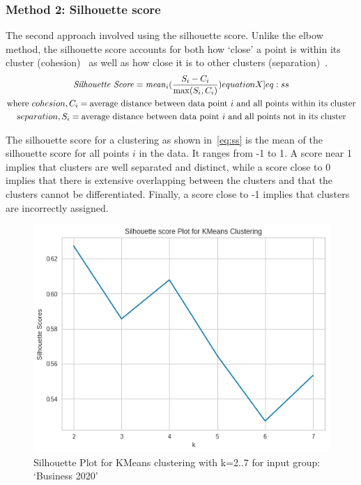 \vspace*{-1ex}
\subsubsection{Method 2: Silhouette score} \label{s:silhouette score}

The second approach involved using the silhouette score. Unlike the elbow method, the silhouette score accounts for both how `close' a point is within its cluster (cohesion)~\cite{elbowvssil} as well as how close it is to other clusters (separation)~\cite{silhouette}.
\begin{gather}
  \mathit{Silhouette \ Score} = \mathit{mean}_i (\frac{S_i - C_i}{\max(S_i, C_i)}) \label[equationX]{eq:ss} \\
  \text{where~$cohesion, C_i$} = \text{average distance between data point~$i$ and all points within its cluster} \nonumber \\
  \text{$separation, S_i$} = \text{average distance between data point~$i$ and all points not in its cluster}\nonumber
\end{gather}

The silhouette score for a clustering as shown in~\ref{eq:ss} is the mean of the silhouette score for all points $i$ in the data. It ranges from -1 to 1. A score near 1 implies that clusters are well separated and distinct, while a score close to 0 implies that there is extensive overlapping between the clusters and that the clusters cannot be differentiated. Finally, a score close to -1 implies that clusters are incorrectly assigned.

\begin{figure}[H]
\centering
\includegraphics[width=0.4\linewidth]{images/sil_kmeans_.png}
\caption{Silhouette Plot for KMeans clustering with k=2..7 for input group: `Business 2020'}
\label{fig:sil_kmeans}
\end{figure}
\vspace{-2ex}

